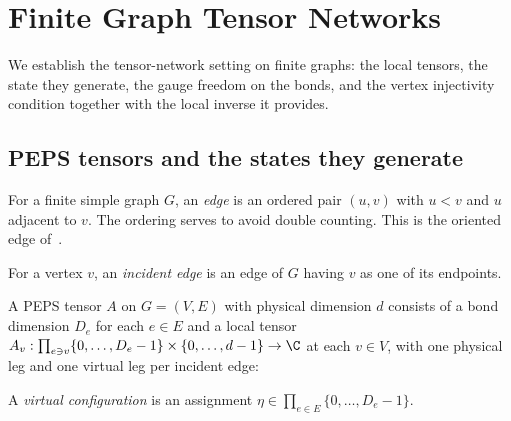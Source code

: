 \section{Finite Graph Tensor Networks}\label{sec:peps_foundations}

We establish the tensor-network setting on finite graphs: the local tensors,
the state they generate, the gauge freedom on the bonds, and the vertex
injectivity condition together with the local inverse it provides.

\subsection{PEPS tensors and the states they generate}

\begin{definition}
    \label{def:peps_edge}
    \leanok
    For a finite simple graph $G$, an \emph{edge} is an ordered pair
    $(u,v)$ with $u < v$ and $u$ adjacent to $v$.
    The ordering serves to avoid double counting. This is the oriented edge
    of~\cite[``Oriented edges'']{QICLean2026Blueprint}.
\end{definition}

\begin{definition}
    \label{def:peps_incident_edge}
    \leanok
    For a vertex $v$, an \emph{incident edge} is an edge of $G$ having $v$
    as one of its endpoints.
\end{definition}

\begin{definition}
    \label{def:peps_tensor}
    \leanok
    A PEPS tensor $A$ on $G=(V,E)$ with physical dimension $d$ consists of a bond
    dimension $D_e$ for each $e\in E$ and a local tensor
    $A_v:\prod_{e\ni v}\{0,\ldots,D_e-1\}\times\{0,\ldots,d-1\}\to\C$ at each
    $v\in V$, with one physical leg and one virtual leg per incident edge:
    
\end{definition}

\begin{definition}
    \label{def:peps_virtual_config}
    \leanok
    A \emph{virtual configuration} is an assignment
    $\eta\in\prod_{e\in E}\{0,\ldots,D_e-1\}$.
\end{definition}

